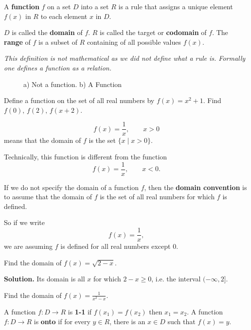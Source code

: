 \documentclass[../main.tex]{subfiles}
\begin{document}
A \textbf{function} $f$ on a set $D$ into a set $R$ is a rule that assigns a unique element $f(x)$ in $R$ to each element $x$ in $D$.

$D$ is called the \textbf{domain} of $f$. $R$ is called the target or \textbf{codomain} of $f$. The \textbf{range} of $f$ is a subset of $R$ containing of all possible values $f(x)$.

\textit{
This definition is not mathematical as we did not define what a rule is. Formally one defines a function as a relation.}

\begin{figure}[H]
  \centering
  \subfloat[a]{
  \scalebox{.8}{}
  }
  \subfloat[b]{
  \scalebox{.8}{}
  }
  \caption{a) Not a function. b) A Function }
  \label{fig:funcNotfunc}
\end{figure}

\begin{example}
  Define a function on the set of all real numbers by $f(x)=x^2+1$. Find $f(0), \, f(2), \, f(x+2)$.
\end{example}

\[
  f(x) = \frac{1}{x}, \qquad x > 0
\]
means that the domain of $f$ is the set $\{x \mid x > 0\}$.

Technically, this function is different from the function
\[
  f(x) = \frac{1}{x}, \qquad x < 0.
\]

If we do not specify the domain of a function $f$, then the \textbf{domain convention} is to assume that the domain of $f$ is the set of all real numbers for which $f$ is defined.

So if we write
\[
  f(x)=\frac{1}{x},
\]
we are assuming $f$ is defined for all real numbers except $0$.


\begin{example}
  Find the domain of $f(x) = \sqrt{2-x}$.

  \textbf{Solution.} Its domain is all $x$ for which $2-x \ge 0$, i.e. the interval $(-\infty, 2]$.
\end{example}

\begin{example}
    Find the domain of $f(x) = \frac{1}{x^2 - x}$.
\end{example}

A function $f: D \to R$ is \textbf{1-1} if $f(x_1) = f(x_2)$ then $x_1=x_2$. A function $f: D \to R$ is \textbf{onto} if for every $y \in R$, there is an $x \in D$ such that $f(x) = y$.
\end{document}
